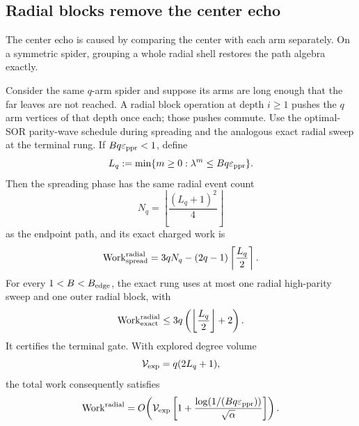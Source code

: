 \subsection{Radial blocks remove the center echo}

The center echo is caused by comparing the center with each arm separately.
On a symmetric spider, grouping a whole radial shell restores the path
algebra exactly.

\begin{theorem}
\label{thm:direct-spider-radial-block}
Consider the same $q$-arm spider and suppose its arms are long enough that the
far leaves are not reached. A radial block operation at depth $i\geq1$
pushes the $q$ arm vertices of that depth once each; those pushes commute.
Use the optimal-SOR parity-wave schedule during spreading and the analogous
exact radial sweep at the terminal rung. If $Bq\varepsilon_{\mathrm{ppr}}<1$, define
\begin{equation}
 L_q:=\min\{m\geq0:\lambda^m\leq Bq\varepsilon_{\mathrm{ppr}}\}.
 \label{eq:direct-spider-radial-depth}
\end{equation}
Then the spreading phase has the same radial event count
\begin{equation}
 N_q=\left\lfloor\frac{(L_q+1)^2}{4}\right\rfloor
 \label{eq:direct-spider-radial-count}
\end{equation}
as the endpoint path, and its exact charged work is
\begin{equation}
 \operatorname{Work}_{\rm spread}^{\rm radial}
 =3qN_q-(2q-1)\left\lceil\frac{L_q}{2}\right\rceil.
 \label{eq:direct-spider-radial-spread-work}
\end{equation}
For every $1<B<B_{\rm edge}$, the exact rung uses at most one radial
high-parity sweep and one outer radial block, with
\begin{equation}
 \operatorname{Work}_{\rm exact}^{\rm radial}
 \leq3q\left(\left\lfloor\frac{L_q}{2}\right\rfloor+2\right).
 \label{eq:direct-spider-radial-exact-work}
\end{equation}
It certifies the terminal gate. With explored degree volume
\begin{equation*}
 \mathcal V_{\rm exp}=q(2L_q+1),
\end{equation*}
the total work consequently satisfies
\begin{equation}
 \operatorname{Work}^{\rm radial}
 =O\!\left(\mathcal V_{\rm exp}
 \left[1+\frac{\log(1/(Bq\varepsilon_{\mathrm{ppr}}))}{\sqrt\alpha}\right]\right).
 \label{eq:direct-spider-radial-volume-work}
\end{equation}
\end{theorem}

